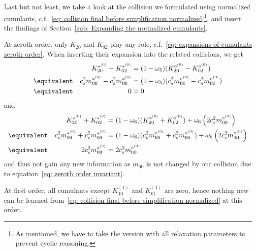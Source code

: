 Last but not least, we take a look at the collision we formulated using normalized cumulants, c.f.~\eqref{eq: collision final before simplification normalized}\footnote{As mentioned, we have to take the version with all relaxation parameters to prevent cyclic reasoning.},
and insert the findings of Section~\ref{sub: Expanding the normalized cumulants}.

At zeroth order, only $K_{20}$ and $K_{02}$ play any role, c.f.~\eqref{eq: expansions of cumulants zeroth order}.
When inserting their expansion into the related collisions, we get
\begin{equation}
  \begin{aligned}
    &&
    K_{20}^{*^{(0)}} - K_{02}^{*^{(0)}}
      & = (1-\omega_5) (K_{20}^{\circ^{(0)}} - K_{02}^{\circ^{(0)}})
      \\ &\equivalent&
    c_s^2 m_{00}^{*^{(0)}} - c_s^2 m_{00}^{*^{(0)}}
        & = (1-\omega_5) (c_s^2 m_{00}^{\circ^{(0)}} - c_s^2 m_{00}^{\circ^{(0)}})
      \\ &\equivalent&
    0 & = 0
  \end{aligned}
\end{equation}
and
\begin{equation}
  \begin{aligned}
    &&K_{20}^{*^{(0)}} + K_{02}^{*^{(0)}}
      & = (1-\omega_6)(K_{20}^{\circ^{(0)}} + K_{02}^{\circ^{(0)}}) + \omega_6 \left( 2 c_s^2 m_{00}^{\circ^{(0)}} \right)
      \\ &\equivalent&
    c_s^2 m_{00}^{*^{(0)}} + c_s^2 m_{00}^{*^{(0)}}
      & = (1-\omega_6)(c_s^2 m_{00}^{\circ^{(0)}} + c_s^2 m_{00}^{\circ^{(0)}}) + \omega_6 \left( 2 c_s^2 m_{00}^{\circ^{(0)}} \right)
      \\ &\equivalent&
    2c_s^2 m_{00}^{*^{(0)}}
      & = 2 c_s^2 m_{00}^{\circ^{(0)}}
  \end{aligned}
\end{equation}
and thus not gain any new information as $m_{00}$ is not changed by our collision due to equation~\eqref{eq: zeroth order invariant}.

At first order, all cumulants except $K_{10}^{(1)}$ and $K_{01}^{(1)}$ are zero, hence nothing new can be learned from~\eqref{eq: collision final before simplification normalized} at this order.

